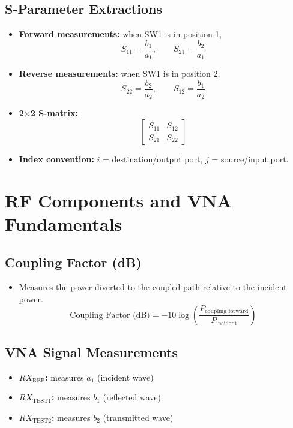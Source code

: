 \documentclass{article}
\begin{document}
\subsection*{S-Parameter Extractions}
\begin{itemize}
    \item \textbf{Forward measurements:} when SW1 is in position 1,
    \[
    S_{11} = \frac{b_1}{a_1}, \qquad S_{21} = \frac{b_2}{a_1}
    \]
    \item \textbf{Reverse measurements:} when SW1 is in position 2,
    \[
    S_{22} = \frac{b_2}{a_2}, \qquad S_{12} = \frac{b_1}{a_2}
    \]
    \item \textbf{2$\times$2 S-matrix:}
    \[
    \begin{bmatrix}
    S_{11} & S_{12} \\
    S_{21} & S_{22}
    \end{bmatrix}
    \]
    \item \textbf{Index convention:} $i$ = destination/output port, $j$ = source/input port.
\end{itemize}

\newpage
\section{RF Components and VNA Fundamentals}

\subsection*{Coupling Factor (dB)}
\begin{itemize}
    \item Measures the power diverted to the coupled path relative to the incident power.
    \[
    \text{Coupling Factor (dB)} = -10 \log \left( \frac{P_{\text{coupling forward}}}{P_{\text{incident}}} \right)
    \]
\end{itemize}

\subsection*{VNA Signal Measurements}
\begin{itemize}
    \item \textbf{$RX_{\text{REF}}$:} measures $a_1$ (incident wave)
    \item \textbf{$RX_{\text{TEST1}}$:} measures $b_1$ (reflected wave)
    \item \textbf{$RX_{\text{TEST2}}$:} measures $b_2$ (transmitted wave)
\end{itemize}
\end{document}
